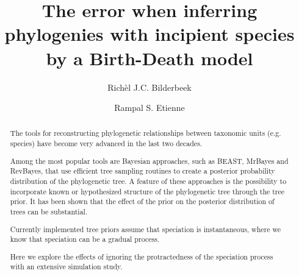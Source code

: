 \documentclass{article}
\title{The error when inferring phylogenies with incipient species by a Birth-Death model}
\author[1]{Rich\`el J.C. Bilderbeek}
\author[1]{Rampal S. Etienne}
\affil[1]{Groningen Institute for Evolutionary Life Sciences, University of Groningen, Groningen, The Netherlands}
\begin{document}
\maketitle

\begin{abstract}



  The tools for reconstructing phylogenetic relationships between taxonomic 
  units (e.g. species) have become very advanced in the last two decades. 

  Among the most popular tools are Bayesian approaches, such as BEAST, MrBayes and RevBayes, 
  that use efficient tree sampling routines to create a posterior probability distribution 
  of the phylogenetic tree. 
  A feature of these approaches is the possibility to incorporate 
  known or hypothesized structure of the phylogenetic tree through the tree prior. 
  It has been shown that the effect of the prior on the posterior distribution 
  of trees can be substantial. 

  Currently implemented tree priors assume that speciation is instantaneous,
  where we know that speciation can be a gradual process.

  Here we explore the effects of ignoring 
  the protractedness of the speciation process with an extensive simulation study. 






\end{abstract}
\end{document}
